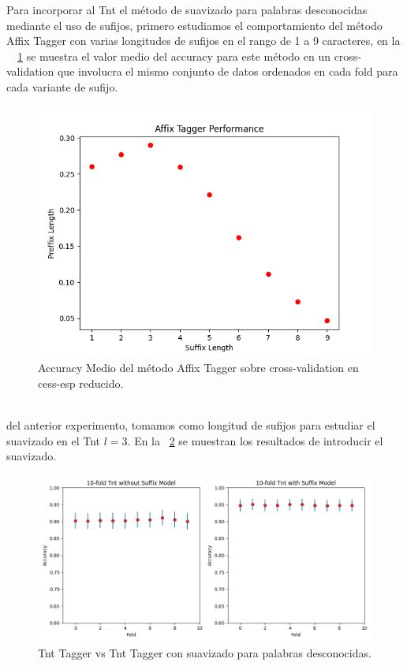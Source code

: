 \documentclass[11pt,a4paper]{report}
\begin{document}
	Para incorporar al Tnt el método de suavizado para palabras desconocidas mediante el uso de sufijos, primero estudiamos el comportamiento del método Affix Tagger  con varias longitudes de sufijos en el rango de 1 a 9 caracteres, en la ~\figurename~\ref{affix} se muestra el valor medio del accuracy para este método en un cross-validation que involucra el mismo conjunto de datos ordenados en cada fold para cada variante de sufijo.
	\vspace{-3mm}
	\begin{figure}[!thb]
		\begin{center}
			\includegraphics[scale=0.55]{images/affix.png}
		\end{center}
		\caption{ Accuracy Medio del método Affix Tagger sobre cross-validation en cess-esp reducido.}
		\label{affix}
	\end{figure}
	\vspace{-2mm}
	\\
	del anterior experimento, tomamos como longitud de sufijos para estudiar el suavizado en el Tnt $l=3$. En la \figurename~\ref{tnt-suffix} se muestran los resultados de introducir el suavizado.
		\begin{figure}[!thb]
		\begin{center}
			\includegraphics[scale=0.6]{images/tnt-suffix.png}
		\end{center}
		\caption{ Tnt Tagger vs Tnt Tagger con suavizado para palabras desconocidas.}
		\label{tnt-suffix}
	\end{figure}
\end{document}
